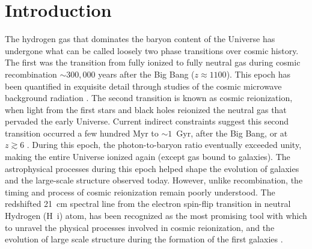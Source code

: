 \documentclass[
reprint,
superscriptaddress,
amsmath,
amssymb,
aps,
prd
]{revtex4-1}
\begin{document}
\pacs{}%


\maketitle


\section{Introduction}\label{sec:intro}

The hydrogen gas that dominates the baryon content of the Universe has undergone what can be called loosely two phase transitions over cosmic history. The first was the transition from fully ionized to fully neutral gas during cosmic recombination $\sim 300,000$ years after the Big Bang ($z\approx 1100$). This epoch has been quantified in exquisite detail through studies of the cosmic microwave background radiation \cite{planck15i}. The second transition is known as cosmic reionization, when light from the first stars and black holes reionized the neutral gas that pervaded the early Universe. Current indirect constraints suggest this second transition occurred a few hundred Myr to $\sim 1$~Gyr, after the Big Bang, or at $z\gtrsim 6$ \cite{gre17}. During this epoch, the photon-to-baryon ratio eventually exceeded unity, making the entire Universe ionized again (except gas bound to galaxies). The astrophysical processes during this epoch helped shape the evolution of galaxies and the large-scale structure observed today. However, unlike recombination, the timing and process of cosmic reionization remain poorly understood.  The redshifted 21~cm spectral line from the electron spin-flip transition in neutral Hydrogen (H~{\sc i}) atom, has been recognized as the most promising tool with which to unravel the physical processes involved in cosmic reionization, and the evolution of large scale structure during the formation of the first galaxies \cite{sun72,sco90,mad97,toz00,ili02,fan02,fan06,bar07,mor10}.
\end{document}
